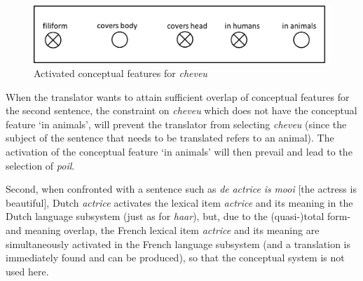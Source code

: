 \begin{figure}
\includegraphics[height=.3\textheight]{figures/Vandevoorde2-img99.png}
\caption{\label{fig:key:96}  Activated conceptual features for \textit{cheveu}}
\end{figure}

When the translator wants to attain sufficient overlap of conceptual features for the second sentence, the constraint on \textit{cheveu} which does not have the conceptual feature ‘in animals’, will prevent the translator from selecting \textit{cheveu} (since the subject of the sentence that needs to be translated refers to an animal). The activation of the conceptual feature ‘in animals’ will then prevail and lead to the selection of \textit{poil}.

Second, when confronted with a sentence such as \textit{de} \textit{actrice} \textit{is} \textit{mooi} [the actress is beautiful], Dutch \textit{actrice} activates the lexical item \textit{actrice} and its meaning in the Dutch language subsystem (just as for \textit{haar}), but, due to the (quasi-)total form- and meaning overlap, the French lexical item \textit{actrice} and its meaning are simultaneously activated in the French language subsystem (and a translation is immediately found and can be produced), so that the conceptual system is not used here.

